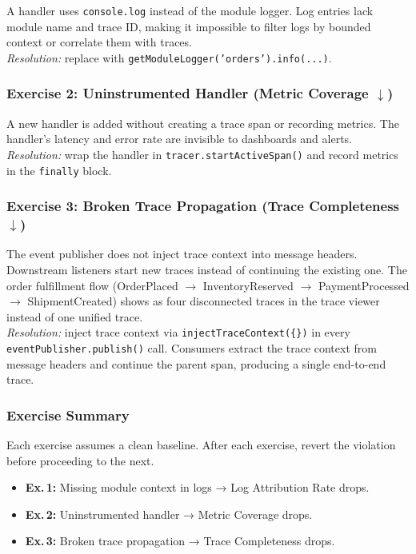 A handler uses \texttt{console.log} instead of the module logger. Log entries lack module name and trace ID, making it impossible to filter logs by bounded context or correlate them with traces.\\
\emph{Resolution:} replace with \texttt{getModuleLogger('orders').info(...)}.

\subsubsection*{Exercise 2: Uninstrumented Handler (Metric Coverage $\downarrow$)}

A new handler is added without creating a trace span or recording metrics. The handler's latency and error rate are invisible to dashboards and alerts.\\
\emph{Resolution:} wrap the handler in \texttt{tracer.startActiveSpan()} and record metrics in the \texttt{finally} block.

\subsubsection*{Exercise 3: Broken Trace Propagation (Trace Completeness $\downarrow$)}

The event publisher does not inject trace context into message headers. Downstream listeners start new traces instead of continuing the existing one. The order fulfillment flow (OrderPlaced $\to$ InventoryReserved $\to$ PaymentProcessed $\to$ ShipmentCreated) shows as four disconnected traces in the trace viewer instead of one unified trace.\\
\emph{Resolution:} inject trace context via \texttt{injectTraceContext(\{\})} in every \texttt{eventPublisher.publish()} call. Consumers extract the trace context from message headers and continue the parent span, producing a single end-to-end trace.

\subsubsection*{Exercise Summary}
Each exercise assumes a clean baseline. After each exercise, revert the violation before proceeding to the next.
\begin{itemize}[itemsep=2pt,topsep=2pt]
  \item \textbf{Ex.\,1:} Missing module context in logs → Log Attribution Rate drops.
  \item \textbf{Ex.\,2:} Uninstrumented handler → Metric Coverage drops.
  \item \textbf{Ex.\,3:} Broken trace propagation → Trace Completeness drops.
\end{itemize}

